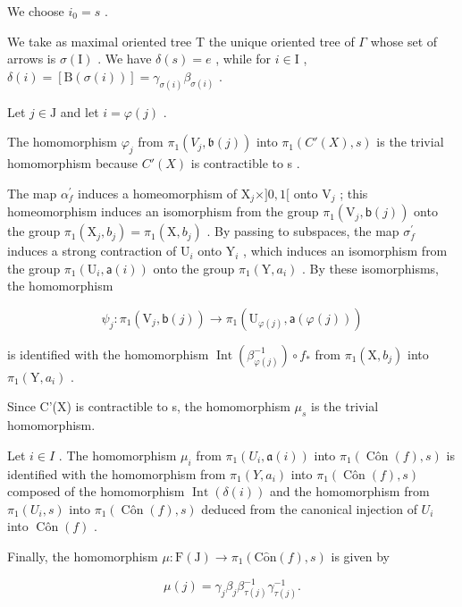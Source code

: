 We choose \(i_{0}=s\) .

We take as maximal oriented tree T the unique oriented tree of \(\Gamma\) whose set of arrows is \(\sigma(\mathrm{I})\) . We have \(\delta(s) = e\) , while for \(i \in \mathrm{I}\) , \(\delta(i) = [\mathrm{B}(\sigma(i))] = \gamma_{\sigma(i)}\beta_{\sigma(i)}\) .

Let \(j \in \mathrm{J}\) and let \(i = \varphi(j)\) .

The homomorphism \(\varphi_{j}\) from \(\pi_1(V_j, \mathfrak{b}(j))\) into \(\pi_1(C'(X), s)\) is the trivial homomorphism because \(C'(X)\) is contractible to s .

The map \(\alpha_{f}^{\prime}\) induces a homeomorphism of \(\mathrm{X}_{j} \times ]0,1[\) onto \(\mathrm{V}_{j}\) ; this homeomorphism induces an isomorphism from the group \(\pi_{1}(\mathrm{V}_{j},\mathsf{b}(j))\) onto the group \(\pi_{1}(\mathrm{X}_{j},b_{j}) = \pi_{1}(\mathrm{X},b_{j})\) . By passing to subspaces, the map \(\sigma_{f}^{\prime}\) induces a strong contraction of \(\mathrm{U}_{i}\) onto \(\mathrm{Y}_{i}\) , which induces an isomorphism from the group \(\pi_{1}(\mathrm{U}_{i},\mathsf{a}(i))\) onto the group \(\pi_{1}(\mathrm{Y},a_{i})\) . By these isomorphisms, the homomorphism

\[
\psi_ {j} \colon \pi_ {1} (\mathrm{V} _ {j}, \mathsf {b} (j)) \to \pi_ {1} (\mathrm{U} _ {\varphi (j)}, \mathsf {a} (\varphi (j)))
\]

is identified with the homomorphism \(\operatorname{Int}(\beta_{\varphi(j)}^{-1}) \circ f_*\) from \(\pi_1(\mathrm{X}, b_j)\) into \(\pi_1(\mathrm{Y}, a_i)\) .

Since C'(X) is contractible to s, the homomorphism \(\mu_{s}\) is the trivial homomorphism.

Let \(i \in I\) . The homomorphism \(\mu_i\) from \(\pi_1(U_i, \mathfrak{a}(i))\) into \(\pi_1(\operatorname{Côn}(f), s)\) is identified with the homomorphism from \(\pi_1(Y, a_i)\) into \(\pi_1(\operatorname{Côn}(f), s)\) composed of the homomorphism \(\operatorname{Int}(\delta(i))\) and the homomorphism from \(\pi_1(U_i, s)\) into \(\pi_1(\operatorname{Côn}(f), s)\) deduced from the canonical injection of \(U_i\) into \(\operatorname{Côn}(f) \) .

Finally, the homomorphism \(\mu\colon\mathrm{F}(\mathrm{J})\to\pi_{1}(\mathrm{C}\hat{\mathrm{o}}\mathrm{n}(f),s)\) is given by

\[
\mu (j) = \gamma_ {j} \beta_ {j} \beta_ {\tau (j)} ^ {- 1} \gamma_ {\tau (j)} ^ {- 1}.
\]

